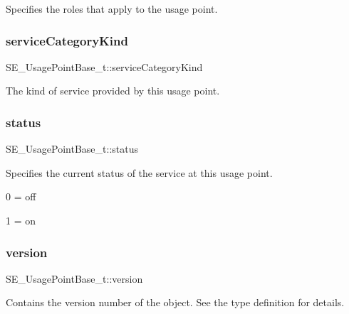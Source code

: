 Specifies the roles that apply to the usage point. \mbox{\label{group__UsagePointBase_ga17715cd7dae4aee1bf4b42dd3e43ebf9}} 
\subsubsection{\texorpdfstring{service\+Category\+Kind}{serviceCategoryKind}}
{\footnotesize\ttfamily S\+E\+\_\+\+Usage\+Point\+Base\+\_\+t\+::service\+Category\+Kind}

The kind of service provided by this usage point. \mbox{\label{group__UsagePointBase_gac5ad1f28ffeedfbbe4348b73d1ad02aa}} 
\subsubsection{\texorpdfstring{status}{status}}
{\footnotesize\ttfamily S\+E\+\_\+\+Usage\+Point\+Base\+\_\+t\+::status}

Specifies the current status of the service at this usage point.

0 = off

1 = on \mbox{\label{group__UsagePointBase_gadfbfb6da5311e41818e8d9df8109c4b6}} 
\subsubsection{\texorpdfstring{version}{version}}
{\footnotesize\ttfamily S\+E\+\_\+\+Usage\+Point\+Base\+\_\+t\+::version}

Contains the version number of the object. See the type definition for details. 